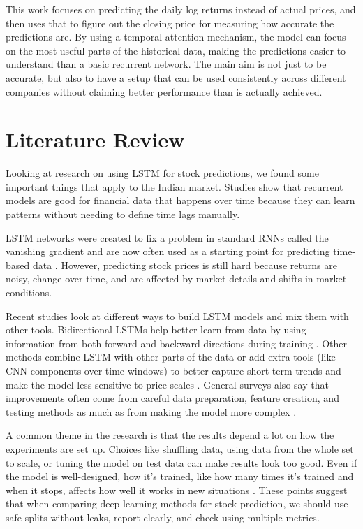 \documentclass[conference]{IEEEtran}
\begin{document}
This work focuses on predicting the daily log returns instead of actual prices, and then uses that to figure out the closing price for measuring how accurate the predictions are. By using a temporal attention mechanism, the model can focus on the most useful parts of the historical data, making the predictions easier to understand than a basic recurrent network. The main aim is not just to be accurate, but also to have a setup that can be used consistently across different companies without claiming better performance than is actually achieved.

\section{Literature Review}

Looking at research on using LSTM for stock predictions, we found some important things that apply to the Indian market. Studies show that recurrent models are good for financial data that happens over time because they can learn patterns without needing to define time lags manually.

LSTM networks were created to fix a problem in standard RNNs called the vanishing gradient and are now often used as a starting point for predicting time-based data \cite{b4}. However, predicting stock prices is still hard because returns are noisy, change over time, and are affected by market details and shifts in market conditions.

Recent studies look at different ways to build LSTM models and mix them with other tools. Bidirectional LSTMs help better learn from data by using information from both forward and backward directions during training \cite{b13}. Other methods combine LSTM with other parts of the data or add extra tools (like CNN components over time windows) to better capture short-term trends and make the model less sensitive to price scales \cite{b10}. General surveys also say that improvements often come from careful data preparation, feature creation, and testing methods as much as from making the model more complex \cite{b12}.

A common theme in the research is that the results depend a lot on how the experiments are set up. Choices like shuffling data, using data from the whole set to scale, or tuning the model on test data can make results look too good. Even if the model is well-designed, how it's trained, like how many times it's trained and when it stops, affects how well it works in new situations \cite{b6}. These points suggest that when comparing deep learning methods for stock prediction, we should use safe splits without leaks, report clearly, and check using multiple metrics.
\end{document}
